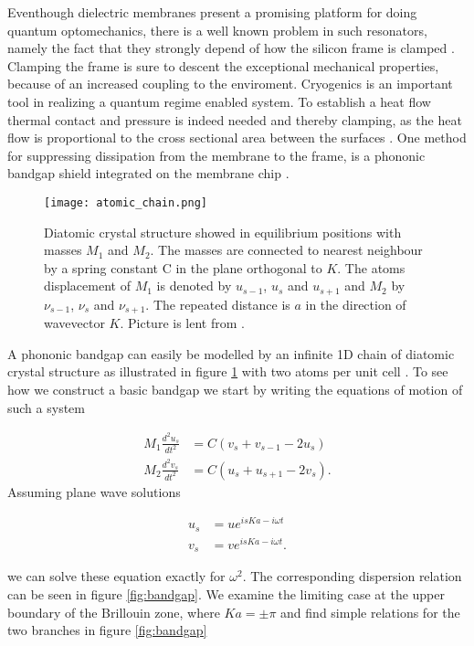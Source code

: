 Eventhough dielectric membranes present a promising platform for doing quantum optomechanics, there is a well known problem in such resonators, namely the fact that they strongly depend of how the silicon frame is clamped \cite{wilson2009}. Clamping the frame is sure to descent the exceptional mechanical properties, because of an increased coupling to the enviroment. Cryogenics is an important tool in realizing a quantum regime enabled system. To establish a heat flow thermal contact and pressure is indeed needed and thereby clamping, as the heat flow is proportional to the cross sectional area between the surfaces \cite{schroeder2000}. One method for suppressing dissipation from the membrane to the frame, is a phononic bandgap shield integrated on the membrane chip \cite{yu2014, tsaturyan2014}.

\begin{figure}[H]
\centering
\texttt{[image: atomic\_chain.png]}
\caption{Diatomic crystal structure showed in equilibrium positions with masses $M_1$ and $M_2$. The masses are connected to nearest neighbour by a spring constant C in the plane orthogonal to $K$. The atoms displacement of $M_1$ is denoted by $u_{s-1}$, $u_{s}$ and $u_{s+1}$ and $M_2$ by $\nu_{s-1}$, $\nu_{s}$ and $\nu_{s+1}$. The repeated distance is $a$ in the direction of wavevector $K$. Picture is lent from \cite{kittel2005}.}
\label{atomic_chain}
\end{figure}

A phononic bandgap can easily be modelled by an infinite 1D chain of diatomic crystal structure as illustrated in figure \ref{atomic_chain} with two atoms per unit cell \cite{kittel2005}. To see how we construct a basic bandgap we start by writing the equations of motion of such a system

\begin{align}
M_1\frac{d^2u_s}{dt^2} &= C\left( v_s + v_{s-1} - 2u_s \right) \\
M_2\frac{d^2v_s}{dt^2} &= C\left( u_s + u_{s+1} - 2v_s \right).
\end{align}
\noindent
Assuming plane wave solutions

\begin{align}
u_s &= ue^{isKa - i\omega t} \\
v_s &= ve^{isKa - i\omega t}.
\end{align}

we can solve these equation exactly for $\omega^2$. The corresponding dispersion relation can be seen in figure \ref{fig:bandgap}. We examine the limiting case at the upper boundary of the Brillouin zone, where $Ka = \pm \pi$ and find simple relations for the two branches in figure \ref{fig:bandgap}

